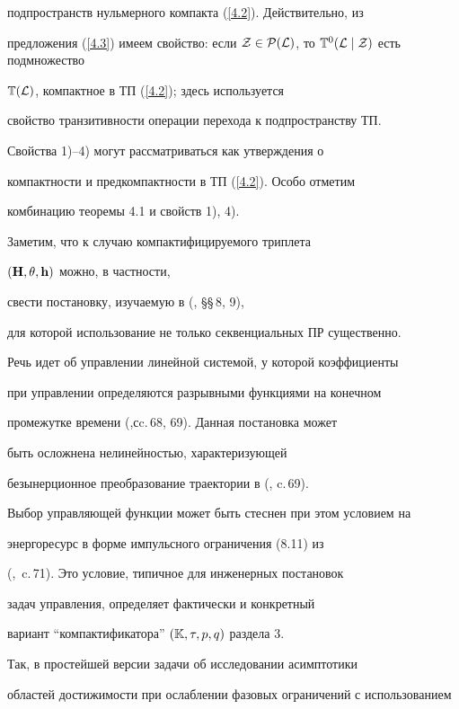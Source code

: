 {подпространств нульмерного компакта (\ref{4.2}). Действительно, из


предложения (\ref{4.3}) имеем свойство: если ${\cal Z} \in {\cal


P}({\cal L})$, то ${{\Bbb T}^0}({\cal L}\mid{\cal Z})$ есть подмножество


${\Bbb T}({\cal L})$, компактное в ТП (\ref{4.2}); здесь используется


свойство транзитивности операции перехода к подпространству ТП.


Свойства 1)--4) могут рассматриваться как утверждения о


компактности и предкомпактности в ТП (\ref{4.2}). Особо отметим


комбинацию теоремы 4.1 и свойств 1), 4).





Заметим, что к случаю компактифицируемого триплета


$({\bold H},\theta,{\bold h})$ можно, в частности,


свести постановку, изучаемую в (\cite{15}, \S\S\,8, 9),


для которой использование не только секвенциальных ПР существенно.


Речь идет об  управлении линейной системой, у которой коэффициенты


при управлении определяются разрывными функциями на конечном


промежутке времени (\cite{15},\linebreak сc.\,68, 69). Данная постановка может


быть осложнена нелинейностью, характеризующей


безынерционное преобразование траектории в (\cite{15}, c.\,69).


Выбор управляющей функции может быть стеснен при этом условием на


энергоресурс в форме импульсного ограничения (8.11) из


(\cite{15},~c.\,71). Это условие, типичное для инженерных постановок


задач управления, определяет фактически и конкретный


вариант ``компактификатора'' $({\Bbb K},\tau,p,q)$ раздела 3.


Так, в простейшей версии задачи об исследовании асимптотики


областей достижимости при ослаблении фазовых ограничений с использованием


}
